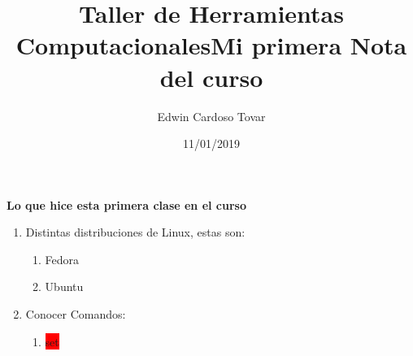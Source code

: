 \documentclass[letterpaper, 12pt, oneside]{article}%
\title{\Huge Taller de Herramientas Computacionales}
\author{Edwin Cardoso Tovar}
\date{11/01/2019}
\begin{document}
	\maketitle
    \newpage
    
    \title{\Huge Mi primera Nota del curso\\}
    
    \textbf{Lo que hice esta primera clase en el curso}
    
    \begin{enumerate}
    	\item Distintas distribuciones de Linux,
    	estas son:
    	\begin{enumerate}
    		\item Fedora
    		\item Ubuntu
    		
    	\end{enumerate}
    	\item Conocer Comandos:
    	\begin{enumerate}
    		\item \colorbox{red}{set}
    		
    	
    	\end{enumerate}
    \end{enumerate}
	
\end{document}
